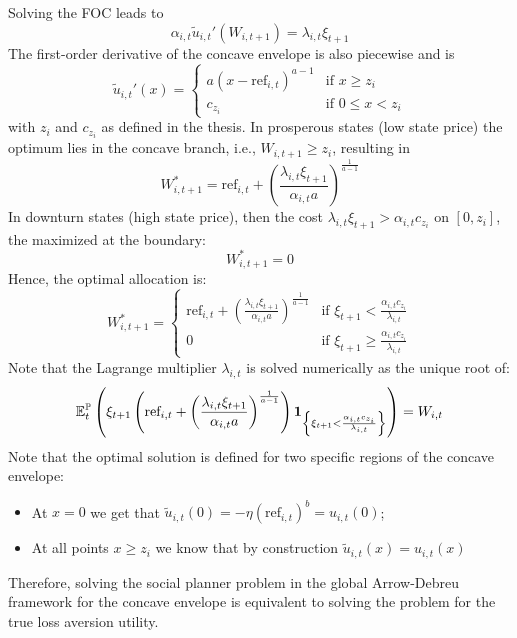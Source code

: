 Solving the FOC leads to
\begin{equation*}
    \alpha_{i,t} \tilde{u}_{i,t}'(W_{i,t+1}) = \lambda_{i,t} \xi_{t+1}
\end{equation*}
The first-order derivative of the concave envelope is also piecewise and is
\begin{equation*}
    \tilde{u}_{i,t}'(x) = \begin{cases} a(x - \text{ref}_{i,t})^{a-1} & \text{if } x \ge z_i \\ c_{z_i} & \text{if } 0 \le x < z_i \end{cases}
\end{equation*}
with $z_i$ and $c_{z_i}$ as defined in the thesis. In prosperous states (low state price) the optimum lies in the concave branch, i.e., $W_{i,t+1} \geq z_i$, resulting in
\begin{equation*}
    W_{i,t+1}^* = \text{ref}_{i,t} + \left( \frac{\lambda_{i,t} \xi_{t+1}}{\alpha_{i,t} a} \right)^{\frac{1}{a-1}}
\end{equation*}
In downturn states (high state price), then the cost $\lambda_{i,t} \xi_{t+1} > \alpha_{i,t} c_{z_i}$ on $[0, z_i]$, the maximized at the boundary:
\begin{equation*}
    W_{i,t+1}^* = 0
\end{equation*}
Hence, the optimal allocation is:
\begin{equation*}
    W_{i,t+1}^* = \begin{cases} \text{ref}_{i,t} + \left( \frac{\lambda_{i,t} \xi_{t+1}}{\alpha_{i,t} a} \right)^{\frac{1}{a-1}} & \text{if } \xi_{t+1} < \frac{\alpha_{i,t} c_{z_i}}{\lambda_{i,t}} \\ 0 & \text{if } \xi_{t+1} \ge \frac{\alpha_{i,t} c_{z_i}}{\lambda_{i,t}} \end{cases}
\end{equation*}
Note that the Lagrange multiplier $\lambda_{i,t}$ is solved numerically as the unique root of:
\begin{equation*}
    \mathbb{E}_t^{\mathbb{P}}\left( \xi_{t+1} \left( \text{ref}_{i,t} + \left( \frac{\lambda_{i,t} \xi_{t+1}}{\alpha_{i,t} a} \right)^{\frac{1}{a-1}} \right) \mathbf{1}_{\left\{\xi_{t+1} < \frac{\alpha_{i,t} c_{z_i}}{\lambda_{i,t}}\right\}} \right) = W_{i,t}
\end{equation*}
Note that the optimal solution is defined for two specific regions of the concave envelope:
\begin{itemize}
    \item At $x=0$ we get that $\tilde{u}_{i,t}(0) = - \eta (\text{ref}_{i,t})^b = u_{i,t}(0)$;
    \item At all points $x \geq z_i$ we know that by construction $\tilde{u}_{i,t}(x) = u_{i,t}(x)$
\end{itemize}
Therefore, solving the social planner problem in the global Arrow-Debreu framework for the concave envelope is equivalent to solving the problem for the true loss aversion utility.
